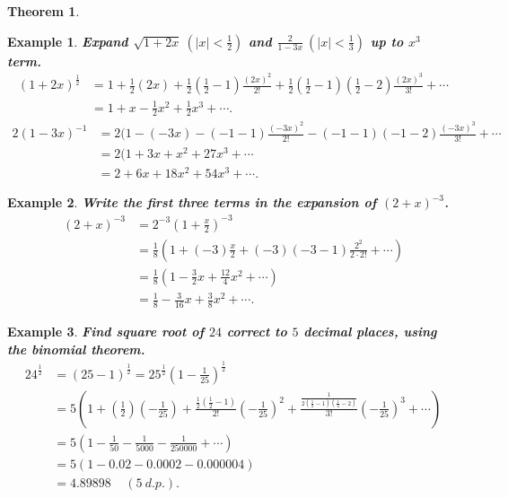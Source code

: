 \documentclass[12pt, a4paper]{article}
\newtheorem{theorem}{Theorem}[subsection]
\newtheorem{example}{Example}[subsection]
\begin{document}
\begin{enumerate}
\begin{theorem}
  \end{theorem}
  \begin{example}
    \textbf{Expand $\sqrt{1+2x}\ \left(\left|x\right|<\frac{1}{2}\right)$ and $\frac{2}{1-3x}\ \left(\left|x\right|<\frac{1}{3}\right)$ up to $x^3$ term.}
    $$\begin{aligned}
      (1+2x)^\frac{1}{2}&=1+\frac{1}{2}(2x)+\frac{1}{2}\left(\frac{1}{2}-1\right)\frac{(2x)^2}{2!}+\frac{1}{2}\left(\frac{1}{2}-1\right)\left(\frac{1}{2}-2\right)\frac{(2x)^3}{3!}+\cdots\\
      &=1+x-\frac{1}{2}x^2+\frac{1}{2}x^3+\cdots.
    \end{aligned}$$
    $$\begin{aligned}
      2(1-3x)^{-1}&=2(1-(-3x)-\left(-1-1\right)\frac{(-3x)^2}{2!}-\left(-1-1\right)\left(-1-2\right)\frac{(-3x)^3}{3!}+\cdots\\
      &=2(1+3x+x^2+27x^3+\cdots\\
      &=2+6x+18x^2+54x^3+\cdots.
    \end{aligned}$$
  \end{example}
  \begin{example}
    \textbf{Write the first three terms in the expansion of $(2+x)^{-3}$.}
    $$\begin{aligned}
      (2+x)^{-3}&=2^{-3}\left(1+\frac{x}{2}\right)^{-3}\\
      &=\frac{1}{8}\left(1+(-3)\frac{x}{2}+(-3)(-3-1)\frac{2^2}{2\cdot 2!}+\cdots\right)\\
      &=\frac{1}{8}\left(1-\frac{3}{2}x+\frac{12}{4}x^2+\cdots\right)\\
      &=\frac{1}{8}-\frac{3}{16}x+\frac{3}{8}x^2+\cdots.
    \end{aligned}$$
  \end{example}
  \begin{example}
    \textbf{Find square root of $24$ correct to $5$ decimal places, using the binomial theorem.}
    $$\begin{aligned}
      24^\frac{1}{2}&=(25-1)^\frac{1}{2}=25^\frac{1}{2}\left(1-\frac{1}{25}\right)^\frac{1}{2}\\
      &=5\left(1+\left(\frac{1}{2}\right)\left(-\frac{1}{25}\right)+\frac{\frac{1}{2}\left(\frac{1}{2}-1\right)}{2!}\left(-\frac{1}{25}\right)^2+\frac{\frac{1}{2\left(\frac{1}{2}-1\right)\left(\frac{1}{2}-2\right)}}{3!}\left(-\frac{1}{25}\right)^3+\cdots\right)\\
      &=5\left(1-\frac{1}{50}-\frac{1}{5000}-\frac{1}{250000}+\cdots\right)\\
      &=5(1-0.02-0.0002-0.000004)\\
      &=4.89898 \ \ \ \ \ (5\ d.p.). 
    \end{aligned}$$
  \end{example}
\end{enumerate}
\end{document}
